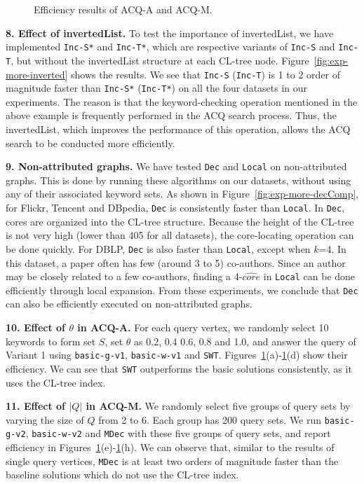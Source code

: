 \begin{figure}[htb]
\begin{tabular}{c c c c}
\end{tabular}
\caption{Efficiency results of ACQ-A and ACQ-M.}
\label{fig:exp-variant}
\end{figure}


\textbf{8. Effect of invertedList.}
To test the importance of invertedList, we have implemented {\tt Inc-S*} and {\tt Inc-T*}, which are respective variants of {\tt Inc-S} and {\tt Inc-T}, but without the invertedList structure at each CL-tree node. Figure~\ref{fig:exp-more-inverted} shows the results. We see that {\tt Inc-S} ({\tt Inc-T}) is 1 to 2 order of magnitude faster than {\tt Inc-S*} ({\tt Inc-T*}) on all the four datasets in our experiments.
The reason is that the keyword-checking operation mentioned in the above example is frequently performed in the ACQ search process. Thus, the invertedList, which improves the performance of this operation, allows the ACQ search to be conducted more efficiently.

\textbf{9. Non-attributed graphs.}
We have tested {\tt Dec} and {\tt Local} on non-attributed graphs. This is done by running these algorithms on our datasets, without using any of their associated keyword sets. As shown in Figure~\ref{fig:exp-more-decComp}, for Flickr, Tencent and DBpedia, {\tt Dec} is consistently faster than {\tt Local}. In {\tt Dec}, cores are organized into the CL-tree structure. Because the height of the CL-tree is not very high (lower than 405 for all datasets), the core-locating operation can be done quickly. For DBLP, {\tt Dec} is also  faster than {\tt Local}, except when $k$=4. In this dataset, a paper often has few (around 3 to 5) co-authors. Since an author may be closely related to a few co-authors, finding a 4-$\widehat {core}$ in {\tt Local} can be done efficiently through local expansion.  From these experiments, we conclude that {\tt Dec} can also be efficiently executed on non-attributed graphs.

{\color{blue}
\textbf{10. Effect of $\theta$ in ACQ-A.}
For each query vertex, we randomly select 10 keywords to form set $S$, set $\theta$ as 0.2, 0.4 0.6, 0.8 and 1.0,
and answer the query of Variant 1 using {\tt basic-g-v1}, {\tt basic-w-v1} and {\tt SWT}.
Figures~\ref{fig:exp-variant}(a)-\ref{fig:exp-variant}(d) show their efficiency.
We can see that {\tt SWT} outperforms the basic solutions consistently, as it uses the CL-tree index.

\textbf{11. Effect of $|Q|$ in ACQ-M.}
We randomly select five groups of query sets by varying the size of $Q$ from 2 to 6.
Each group has 200 query sets.
We run {\tt basic-g-v2}, {\tt basic-w-v2} and {\tt MDec} with these five groups of query sets,
and report efficiency in Figures~\ref{fig:exp-variant}(e)-\ref{fig:exp-variant}(h).
We can observe that, similar to the results of single query vertices, {\tt MDec} is at least two orders of magnitude faster than the baseline solutions which do not use the CL-tree index.
}